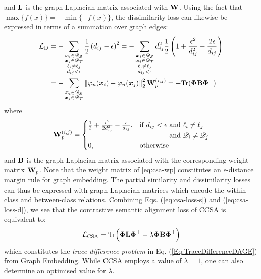 \documentclass[journal]{IEEEtran}
\renewcommand{\vector}[1]{\ensuremath{\bm{\lowercase{#1}}}}
\renewcommand{\matrix}[1]{\ensuremath{\bm{\mathbf{\uppercase{#1}}}}}
\newcommand{\vx}{\vector{x}}
\newcommand{\Domain}{\mathscr{D}} \newcommand{\Task}{\mathscr{T}} \newcommand{\concept}[1]{\ensuremath{\mathcal{\uppercase{#1}}}}
\newcommand{\norm}[1]{\ensuremath{\left\|#1 \right\|}}
\newcommand{\Src}{\mathcal{S}} \newcommand{\Tgt}{\mathcal{T}}
\newcommand{\tr}{\text{Tr}}
\begin{document}
and $\matrix{L}$ is the graph Laplacian matrix associated with $\matrix{W}$.
Using the fact that $\max \{ f(x) \} = -\min\{ -f(x)\}$, the dissimilarity loss can likewise be expressed in terms of a summation over graph edges:
\begin{align} \label{eq:csa-loss-d}
    \concept{L}_{\text{D}}
    &= 
    -\sum_{\substack{
        \vx_i \in \Domain_\Src \\
        \vx_j \in \Domain_\Tgt  \\
        \ell_i \neq  \ell_j \\
        d_{ij} < \epsilon
    }}
    \frac{1}{2} \left( d_{ij} - \epsilon \right)^2
    = 
    -\sum_{\substack{
        \vx_i \in \Domain_\Src \\
        \vx_j \in \Domain_\Tgt  \\
        \ell_i \neq  \ell_j \\
        d_{ij} < \epsilon
    }}
    d_{ij}^2 \frac{1}{2} \left(1 + \frac{\epsilon^2}{d_{ij}^2} - \frac{2\epsilon}{d_{ij}}\right)
    \notag
    \\
    &= 
    -\sum_{\substack{
        \vx_i \in \Domain_\Src \\
        \vx_j \in \Domain_\Tgt
    }}
    \norm{\varphi_n(\vx_i)-\varphi_n(\vx_j)}_2^2 \matrix{W}_p^{(i,j)}
    = 
    -\tr(\matrix{\Phi} \matrix{B} \matrix{\Phi}^\top)
\end{align}
where
\begin{equation}\label{eq:csa-wp}
    \matrix{W}_p^{(i,j)} = 
        \begin{cases}
            \frac{1}{2} + \frac{\epsilon^2}{2 d_{ij}^2} - \frac{\epsilon}{d_{ij}}, 
                &   \!\begin{aligned}[t]
                       \text{if } d_{ij} < \epsilon &\text{ and } \ell_i \neq \ell_j \\
                       &\text{ and } \Domain_i \neq \Domain_j
                    \end{aligned}
            \\
            0, & \text{otherwise } \\
        \end{cases}
\end{equation}
and $\matrix{B}$ is the graph Laplacian matrix associated with the corresponding weight matrix $\matrix{W}_p$. Note that the weight matrix of \cref{eq:csa-wp} constitutes an $\epsilon$-distance margin rule for graph embedding. 
The partial similarity and dissimilarity losses can thus be expressed with graph Laplacian matrices which encode the within-class and between-class relations. Combining Eqs. (\ref{eq:csa-loss-s}) and (\ref{eq:csa-loss-d}), we see that the contrastive semantic alignment loss of CCSA is equivalent to:
\begin{equation}\label{eq:csa-loss-trace-diff}
    \concept{L}_{\text{CSA}} 
    = \tr\Big(\matrix{\Phi} \matrix{L} \matrix{\Phi}^\top - \lambda \matrix{\Phi} \matrix{B} \matrix{\Phi}^\top \Big)
\end{equation}
which constitutes the \textit{trace difference problem} in Eq. (\ref{Eq:TraceDifferenceDAGE}) from Graph Embedding. While CCSA employs a value of $\lambda = 1$, one can also determine an optimised value for $\lambda$. 
\end{document}
